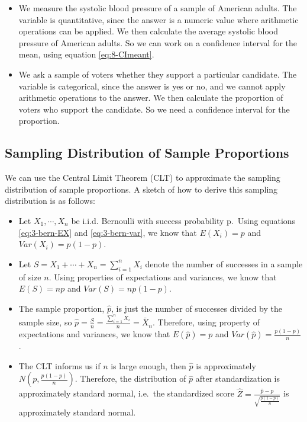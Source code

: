 \documentclass[
]{book}
\begin{document}
\begin{itemize}
\item
  We measure the systolic blood pressure of a sample of American adults. The variable is quantitative, since the answer is a numeric value where arithmetic operations can be applied. We then calculate the average systolic blood pressure of American adults. So we can work on a confidence interval for the mean, using equation \eqref{eq:8-CImeant}.
\item
  We ask a sample of voters whether they support a particular candidate. The variable is categorical, since the answer is yes or no, and we cannot apply arithmetic operations to the answer. We then calculate the proportion of voters who support the candidate. So we need a confidence interval for the proportion.
\end{itemize}

\hypertarget{sampdistprops}{%
\subsection{Sampling Distribution of Sample Proportions}\label{sampdistprops}}

We can use the Central Limit Theorem (CLT) to approximate the sampling distribution of sample proportions. A sketch of how to derive this sampling distribution is as follows:

\begin{itemize}
\item
  Let \(X_1, \cdots, X_n\) be i.i.d. Bernoulli with success probability p.~Using equations \eqref{eq:3-bern-EX} and \eqref{eq:3-bern-var}, we know that \(E(X_i) = p\) and \(Var(X_i) = p(1-p)\).
\item
  Let \(S = X_1 + \cdots + X_n = \sum_{i=1}^n X_i\) denote the number of successes in a sample of size \(n\). Using properties of expectations and variances, we know that \(E(S) = np\) and \(Var(S) = np(1-p)\).
\item
  The sample proportion, \(\hat{p}\), is just the number of successes divided by the sample size, so \(\hat{p} = \frac{S}{n} = \frac{\sum_{i=1}^n X_i}{n} = \bar{X}_n\). Therefore, using property of expectations and variances, we know that \(E(\hat{p}) = p\) and \(Var(\hat{p}) = \frac{p(1-p)}{n}\).
\item
  The CLT informs us if \(n\) is large enough, then \(\hat{p}\) is approximately \(N\left(p, \frac{p(1-p)}{n}\right)\). Therefore, the distribution of \(\hat{p}\) after standardization is approximately standard normal, i.e.~the standardized score \(\hat{Z} = \frac{\hat{p}-p}{\sqrt{\frac{p(1-p)}{n}}}\) is approximately standard normal.
\end{itemize}
\end{document}
